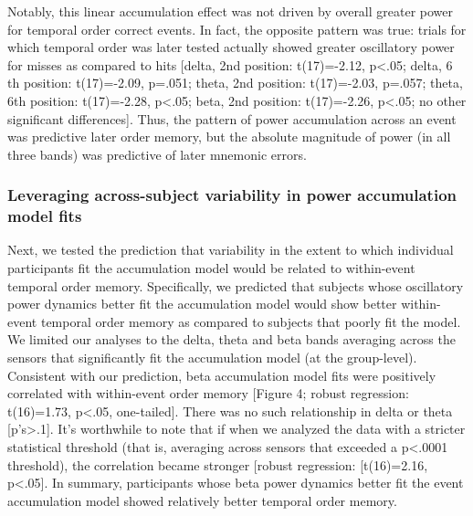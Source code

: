 Notably, this linear accumulation effect was not driven by overall
greater power for temporal order correct events. In fact, the opposite
pattern was true: trials for which temporal order was later tested
actually showed greater oscillatory power for misses as compared to hits
{[}delta, 2nd position: t(17)=-2.12, p\textless{}.05; delta, 6 th
position: t(17)=-2.09, p=.051; theta, 2nd position: t(17)=-2.03, p=.057;
theta, 6th position: t(17)=-2.28, p\textless{}.05; beta, 2nd position:
t(17)=-2.26, p\textless{}.05; no other significant differences{]}. Thus,
the pattern of power accumulation across an event was predictive later
order memory, but the absolute magnitude of power (in all three bands)
was predictive of later mnemonic errors.

\subsubsection{Leveraging across-subject variability in power
accumulation model
fits}\label{leveraging-across-subject-variability-in-power-accumulation-model-fits}

Next, we tested the prediction that variability in the extent to which
individual participants fit the accumulation model would be related to
within-event temporal order memory. Specifically, we predicted that
subjects whose oscillatory power dynamics better fit the accumulation
model would show better within-event temporal order memory as compared
to subjects that poorly fit the model. We limited our analyses to the
delta, theta and beta bands averaging across the sensors that
significantly fit the accumulation model (at the group-level).
Consistent with our prediction, beta accumulation model fits were
positively correlated with within-event order memory {[}Figure 4; robust
regression: t(16)=1.73, p\textless{}.05, one-tailed{]}. There was no
such relationship in delta or theta {[}p's\textgreater{}.1{]}. It's
worthwhile to note that if when we analyzed the data with a stricter
statistical threshold (that is, averaging across sensors that exceeded a
p\textless{}.0001 threshold), the correlation became stronger {[}robust
regression: {[}t(16)=2.16, p\textless{}.05{]}. In summary, participants
whose beta power dynamics better fit the event accumulation model showed
relatively better temporal order memory.

